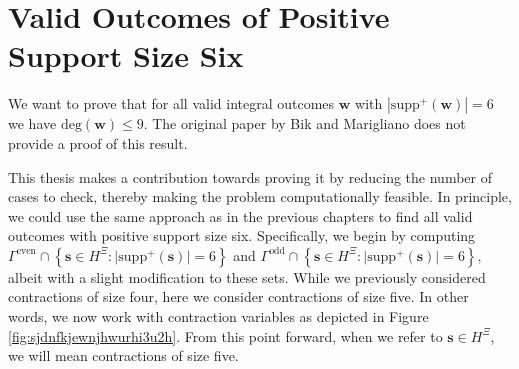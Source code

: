 \chapter{Valid Outcomes of Positive Support Size Six}

We want to prove that for all valid integral outcomes \( \mathbf w \) with \( |\mathrm{supp}^+(\mathbf w)| = 6 \) we have \( \mathrm{deg}(\mathbf w) \leq 9 \).
The original paper by Bik and Marigliano \cite{bik2022classifying} does not provide a proof of this result. 

This thesis makes a contribution towards proving it by reducing the number of cases to check, thereby making the problem computationally feasible. In principle, we could use the same approach as in the previous chapters to find all valid outcomes with positive support size six. Specifically, we begin by computing 
\(
\Gamma^{\mathrm{even}} \cap \left\{ \mathbf{s} \in H^{\Xi} : \lvert \mathrm{supp}^+(\mathbf{s}) \rvert = 6 \right\}
\)
and 
\(
\Gamma^{\mathrm{odd}} \cap \left\{ \mathbf{s} \in H^{\Xi} : \lvert \mathrm{supp}^+(\mathbf{s}) \rvert = 6 \right\},
\)
albeit with a slight modification to these sets. While we previously considered contractions of size four, here we consider contractions of size five. In other words, we now work with contraction variables as depicted in Figure \ref{fig:sjdnfkjewnjhwurhi3u2h}. From this point forward, when we refer to \( \mathbf{s} \in H^{\Xi} \), we will mean contractions of size five.

